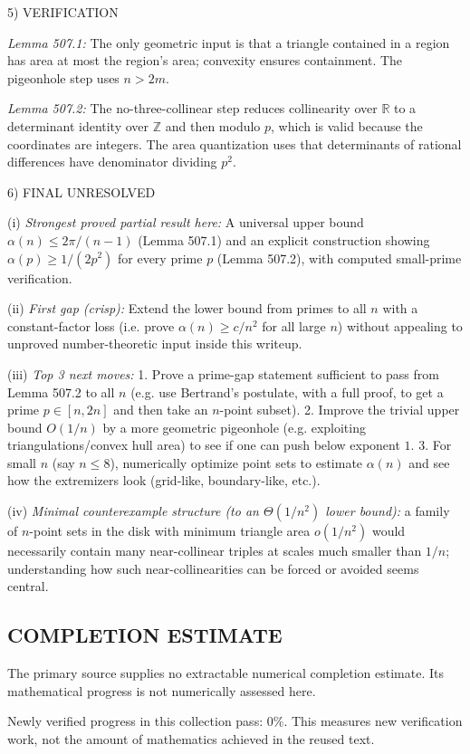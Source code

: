 5) VERIFICATION

\emph{Lemma 507.1:} The only geometric input is that a triangle contained in a region has area at most the region's area; convexity ensures containment. The pigeonhole step uses $n>2m$.

\emph{Lemma 507.2:} The no-three-collinear step reduces collinearity over $\mathbb R$ to a determinant identity over $\mathbb Z$ and then modulo $p$, which is valid because the coordinates are integers. The area quantization uses that determinants of rational differences have denominator dividing $p^2$.

6) FINAL
UNRESOLVED

(i) \emph{Strongest proved partial result here:} A universal upper bound $\alpha(n)\le 2\pi/(n-1)$ (Lemma 507.1) and an explicit construction showing $\alpha(p)\ge 1/(2p^2)$ for every prime $p$ (Lemma 507.2), with computed small-prime verification.

(ii) \emph{First gap (crisp):} Extend the lower bound from primes to all $n$ with a constant-factor loss (i.e. prove $\alpha(n)\ge c/n^2$ for all large $n$) without appealing to unproved number-theoretic input inside this writeup.

(iii) \emph{Top 3 next moves:}
1. Prove a prime-gap statement sufficient to pass from Lemma 507.2 to all $n$ (e.g. use Bertrand's postulate, with a full proof, to get a prime $p\in[n,2n]$ and then take an $n$-point subset).
2. Improve the trivial upper bound $O(1/n)$ by a more geometric pigeonhole (e.g. exploiting triangulations/convex hull area) to see if one can push below exponent $1$.
3. For small $n$ (say $n\le 8$), numerically optimize point sets to estimate $\alpha(n)$ and see how the extremizers look (grid-like, boundary-like, etc.).

(iv) \emph{Minimal counterexample structure (to an $\Theta(1/n^2)$ lower bound):} a family of $n$-point sets in the disk with minimum triangle area $o(1/n^2)$ would necessarily contain many near-collinear triples at scales much smaller than $1/n$; understanding how such near-collinearities can be forced or avoided seems central.




\subsection*{COMPLETION ESTIMATE}
The primary source supplies no extractable numerical completion estimate. Its mathematical progress is not numerically assessed here.

Newly verified progress in this collection pass: $0\%$. This measures new verification work, not the amount of mathematics achieved in the reused text.
